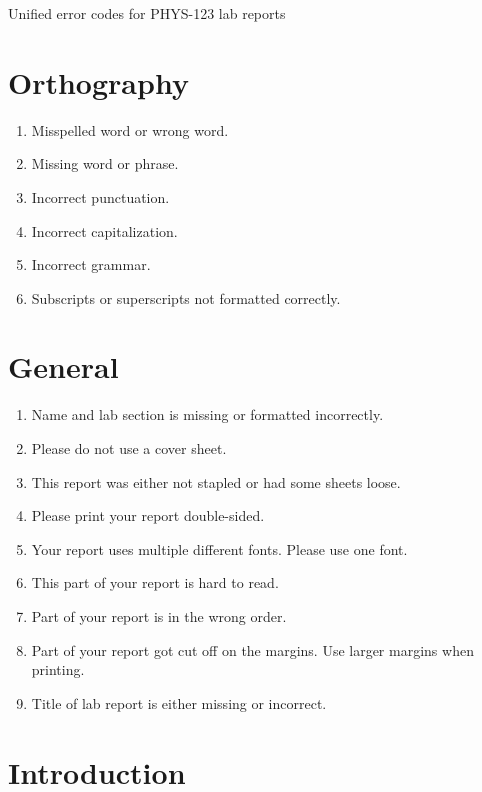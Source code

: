 \documentclass[10pt,letterpaper]{article}
\begin{document}
\begin{center}
  {\huge Unified error codes for PHYS-123 lab reports}
\end{center}

\begin{multicols}{2}

\section{Orthography}

\begin{enumerate}[start=10]
  \item Misspelled word or wrong word.
  \item Missing word or phrase.
  \item Incorrect punctuation.
  \item Incorrect capitalization.
  \item Incorrect grammar.
  \item Subscripts or superscripts not formatted correctly.
\end{enumerate}

\section{General}

\begin{enumerate}[start=20]
  \item Name and lab section is missing or formatted incorrectly.
  \item Please do not use a cover sheet.
  \item This report was either not stapled or had some sheets loose.
  \item Please print your report double-sided.
  \item Your report uses multiple different fonts. Please use one font.
  \item This part of your report is hard to read.
  \item Part of your report is in the wrong order.
  \item Part of your report got cut off on the margins.
    Use larger margins when printing.
  \item Title of lab report is either missing or incorrect.
\end{enumerate}

\section{Introduction}


\end{multicols}
\end{document}
